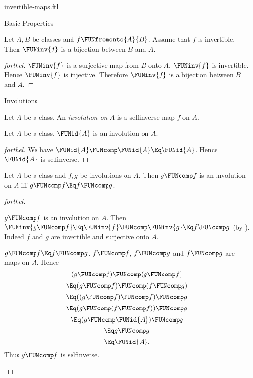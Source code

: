 \documentclass{stex}
\begin{document}
\begin{smodule}{invertible-maps.ftl}
\begin{sfragment}{Basic Properties}
  \begin{corollary}[forthel]
    Let $A, B$ be classes and $f \FUNfromonto{A}{B}$.
    Assume that $f$ is invertible.
    Then $\FUNinv{f}$ is a bijection between $B$ and $A$.
  \end{corollary}
  \begin{proof}[forthel]
    $\FUNinv{f}$ is a surjective map from $B$ onto $A$.
    $\FUNinv{f}$ is invertible.
    Hence $\FUNinv{f}$ is injective.
    Therefore $\FUNinv{f}$ is a bijection between $B$ and $A$.
  \end{proof}
\end{sfragment}

\begin{sfragment}{Involutions}
  \begin{definition}[forthel,for=involution]
    Let $A$ be a class.
    An \emph{involution on $A$} is a selfinverse map $f$ on $A$.
  \end{definition}

  \begin{proposition}[forthel]
    Let $A$ be a class.
    $\FUNid{A}$ is an involution on $A$.
  \end{proposition}
  \begin{proof}[forthel]
    We have $\FUNid{A} \FUNcomp \FUNid{A} \Eq \FUNid{A}$.
    Hence $\FUNid{A}$ is selfinverse.
  \end{proof}

  \begin{proposition}[forthel]
    Let $A$ be a class and $f, g$ be involutions on $A$.
    Then $g \FUNcomp f$ is an involution on $A$ iff $g \FUNcomp f \Eq f \FUNcomp g$.
  \end{proposition}
  \begin{proof}[forthel]
    \begin{case}{$g \FUNcomp f$ is an involution on $A$.}
      Then $\FUNinv{g \FUNcomp f}
        \Eq \FUNinv{f} \FUNcomp \FUNinv{g}
        \Eq f \FUNcomp g$
      (by ).
      Indeed $f$ and $g$ are invertible and surjective onto $A$.
    \end{case}

    \begin{case}{$g \FUNcomp f \Eq f \FUNcomp g$.}
      $f \FUNcomp f$, $f \FUNcomp g$ and $f \FUNcomp g$ are maps on $A$.
      Hence
      \[  (g \FUNcomp f) \FUNcomp (g \FUNcomp f)       \]
      \[    \Eq (g \FUNcomp f) \FUNcomp (f \FUNcomp g)   \]
      \[    \Eq ((g \FUNcomp f) \FUNcomp f) \FUNcomp g   \]
      \[    \Eq (g \FUNcomp (f \FUNcomp f)) \FUNcomp g   \]
      \[    \Eq (g \FUNcomp \FUNid{A}) \FUNcomp g       \]
      \[    \Eq g \FUNcomp g                       \]
      \[    \Eq \FUNid{A}.                        \]
      Thus $g \FUNcomp f$ is selfinverse.
    \end{case}
  \end{proof}


\end{sfragment}
\end{smodule}
\end{document}
